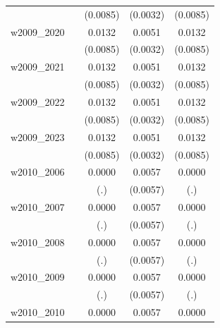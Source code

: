 \begin{table}[htbp]
\begin{tabular}{l*{4}{c}}
            &                     &    (0.0085)         &    (0.0032)         &    (0.0085)         \\
[1em]
w2009\_2020  &                     &      0.0132         &      0.0051         &      0.0132         \\
            &                     &    (0.0085)         &    (0.0032)         &    (0.0085)         \\
[1em]
w2009\_2021  &                     &      0.0132         &      0.0051         &      0.0132         \\
            &                     &    (0.0085)         &    (0.0032)         &    (0.0085)         \\
[1em]
w2009\_2022  &                     &      0.0132         &      0.0051         &      0.0132         \\
            &                     &    (0.0085)         &    (0.0032)         &    (0.0085)         \\
[1em]
w2009\_2023  &                     &      0.0132         &      0.0051         &      0.0132         \\
            &                     &    (0.0085)         &    (0.0032)         &    (0.0085)         \\
[1em]
w2010\_2006  &                     &      0.0000         &      0.0057         &      0.0000         \\
            &                     &         (.)         &    (0.0057)         &         (.)         \\
[1em]
w2010\_2007  &                     &      0.0000         &      0.0057         &      0.0000         \\
            &                     &         (.)         &    (0.0057)         &         (.)         \\
[1em]
w2010\_2008  &                     &      0.0000         &      0.0057         &      0.0000         \\
            &                     &         (.)         &    (0.0057)         &         (.)         \\
[1em]
w2010\_2009  &                     &      0.0000         &      0.0057         &      0.0000         \\
            &                     &         (.)         &    (0.0057)         &         (.)         \\
[1em]
w2010\_2010  &                     &      0.0000         &      0.0057         &      0.0000         \\

\end{tabular}
\end{table}
